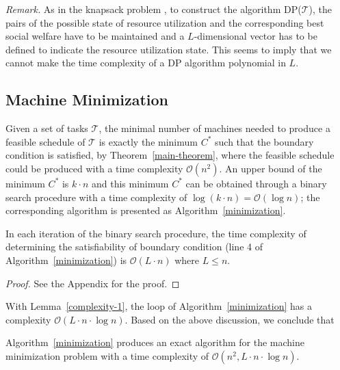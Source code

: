 \documentclass[10pt,journal,compsoc]{IEEEtran}
\begin{document}
\noindent\textit{Remark.} As in the knapsack problem \cite{Williamson}, to construct the algorithm DP($\mathcal{T}$), the pairs of the possible state of resource utilization and the corresponding best social welfare have to be maintained and a $L$-dimensional vector has to be defined to indicate the resource utilization state. This seems to imply that we cannot make the time complexity of a DP algorithm polynomial in $L$.


\subsection{Machine Minimization}





Given a set of tasks $\mathcal{T}$, the minimal number of machines needed to produce a feasible schedule of $\mathcal{T}$ is exactly the minimum $C^{*}$ such that the boundary condition is satisfied, by Theorem~\ref{main-theorem}, where the feasible schedule could be produced with a time complexity $\mathcal{O}(n^{2})$. An upper bound of the minimum $C^{*}$ is $k\cdot n$ and this minimum $C^{*}$ can be obtained through a binary search procedure with a time complexity of $\log{(k\cdot n)}=\mathcal{O}(\log{n})$; the corresponding algorithm is presented as Algorithm~\ref{minimization}.

\begin{lemma}\label{complexity-1}
In each iteration of the binary search procedure, the time complexity of determining the satisfiability of boundary condition (line 4 of Algorithm~\ref{minimization}) is $\mathcal{O}(L\cdot n)$ where $L\leq n$.
\end{lemma}
\begin{proof}
See the Appendix for the proof. 
\end{proof}

With Lemma~\ref{complexity-1}, the loop of Algorithm~\ref{minimization} has a complexity $\mathcal{O}(L\cdot n\cdot \log{n})$. Based on the above discussion, we conclude that

\begin{proposition}\label{machine-minimization}
Algorithm~\ref{minimization} produces an exact algorithm for the machine minimization problem with a time complexity of $\mathcal{O}(n^{2}, L\cdot n\cdot \log{n})$.
\end{proposition}
\end{document}
